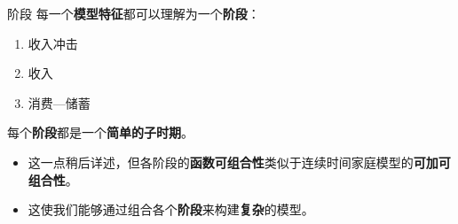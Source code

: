 \documentclass[10pt,aspectratio=169]{beamer}
\begin{document}
\begin{frame}{阶段}
  每一个\textbf{模型特征}都可以理解为一个\textbf{阶段}：
  \begin{enumerate}
    \item 收入冲击
    \item 收入
    \item 消费—储蓄
  \end{enumerate}
  每个\textbf{阶段}都是一个\textbf{简单的子时期}。
  \begin{itemize}
    \item 这一点稍后详述，但各阶段的\textbf{函数可组合性}类似于连续时间家庭模型的\textbf{可加可组合性}。
    \item 这使我们能够通过组合各个\textbf{阶段}来构建\textbf{复杂}的模型。
  \end{itemize}
\end{frame}
\end{document}
